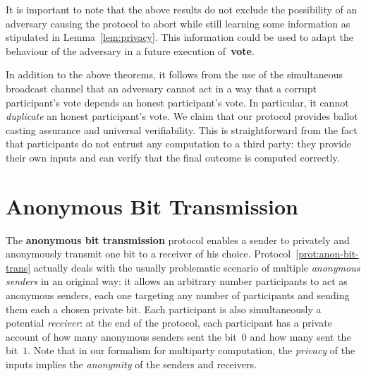 \documentclass[11pt]{article}
\begin{document}
It is important to note that the above results do not exclude the
possibility of an  adversary causing the protocol to abort while
still learning some information as stipulated in
Lemma~\ref{lem:privacy}. This information could be used to adapt the
behaviour of the adversary in a future execution of~\textbf{vote}.

In addition to the above theorems, it follows from the use of the
simultaneous broadcast channel that an adversary cannot act in a way
that a corrupt participant's vote depends an honest participant's
vote. In particular, it cannot \emph{duplicate} an honest
participant's vote. We claim that our protocol provides ballot
casting assurance and universal verifiability. This is
straightforward from the fact that participants do not entrust any
computation to a third party: they provide their own inputs and can
verify that the final outcome is computed correctly.




\section{Anonymous Bit Transmission}
\label{sec:anonymous bit transmission}


The \textbf{anonymous bit transmission} protocol enables a sender to
privately and anonymously transmit one bit to a receiver of his
choice. Protocol~\ref{prot:anon-bit-trans} actually deals with the
usually problematic scenario of multiple \emph{anonymous senders} in
an original way: it allows an arbitrary number participants to act
as anonymous senders, each one targeting any number of participants
and sending them each a chosen private bit.  Each participant is
also simultaneously a potential \emph{receiver}: at the end of the
protocol, each participant has a private account of how many
anonymous senders sent the bit~$0$ and how many sent the bit~$1$.
Note that in our formalism for multiparty computation, the
\emph{privacy }of the inputs implies the \emph{anonymity} of the
senders and receivers.
\end{document}
